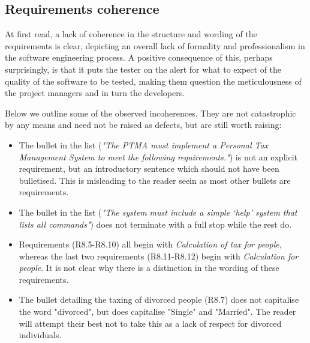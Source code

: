 \subsection{Requirements coherence}
At first read, a lack of coherence in the structure and wording of the requirements is clear, depicting an overall lack of formality and professionalism in the software engineering process. 
A positive consequence of this, perhaps surprisingly, is that it puts the tester on the alert for what to expect of the quality of the software to be tested, making them question the meticulousness of the project managers and in turn the developers.
\par
Below we outline some of the observed incoherences. They are not catastrophic by any means and need not be raised as defects, but are still worth raising:
\begin{itemize}
	\item The  bullet in the list (\textit{"The PTMA must implement a Personal Tax Management System to meet the following requirements."}) is not an explicit requirement, but an introductory sentence which should not have been bulletised. This is misleading to the reader seein as most other bullets are requirements. 
	\item The  bullet in the list (\textit{"The system must include a simple ‘help’ system that lists all commands"}) does not terminate with a full stop while the rest do. 
	\item Requirements (R8.5-R8.10) all begin with \textit{Calculation of tax for people}, whereas the last two requirements (R8.11-R8.12) begin with \textit{Calculation for people}. It is not clear why there is a distinction in the wording of these requirements. 
	\item The bullet detailing the taxing of divorced people (R8.7) does not capitalise the word "divorced", but does capitalise "Single" and "Married". The reader will attempt their best not to take this as a lack of respect for divorced individuals. 
\end{itemize}

